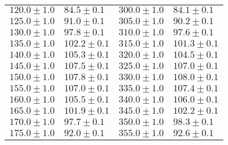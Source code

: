 \documentclass{article}
\begin{document}
\begin{tabular}{|p{3cm}|p{3cm}||p{3cm}|p{3cm}|}
$120.0\pm1.0$&$84.5\pm 0.1$&$300.0\pm1.0$&$84.1\pm 0.1$\\
$125.0\pm1.0$&$91.0\pm 0.1$&$305.0\pm1.0$&$90.2\pm 0.1$\\
$130.0\pm1.0$&$97.8\pm 0.1$&$310.0\pm1.0$&$97.6\pm 0.1$\\
$135.0\pm1.0$&$102.2\pm 0.1$&$315.0\pm1.0$&$101.3\pm 0.1$\\
$140.0\pm1.0$&$105.3\pm 0.1$&$320.0\pm1.0$&$104.5\pm 0.1$\\
$145.0\pm1.0$&$107.5\pm 0.1$&$325.0\pm1.0$&$107.0\pm 0.1$\\
$150.0\pm1.0$&$107.8\pm 0.1$&$330.0\pm1.0$&$108.0\pm 0.1$\\
$155.0\pm1.0$&$107.0\pm 0.1$&$335.0\pm1.0$&$107.4\pm 0.1$\\
$160.0\pm1.0$&$105.5\pm 0.1$&$340.0\pm1.0$&$106.0\pm 0.1$\\
$165.0\pm1.0$&$101.9\pm 0.1$&$345.0\pm1.0$&$102.2\pm 0.1$\\
$170.0\pm1.0$&$97.7\pm 0.1$&$350.0\pm1.0$&$98.3\pm 0.1$\\
$175.0\pm1.0$&$92.0\pm 0.1$&$355.0\pm1.0$&$92.6\pm 0.1$\\
\hline
\end{tabular}
\end{document}

